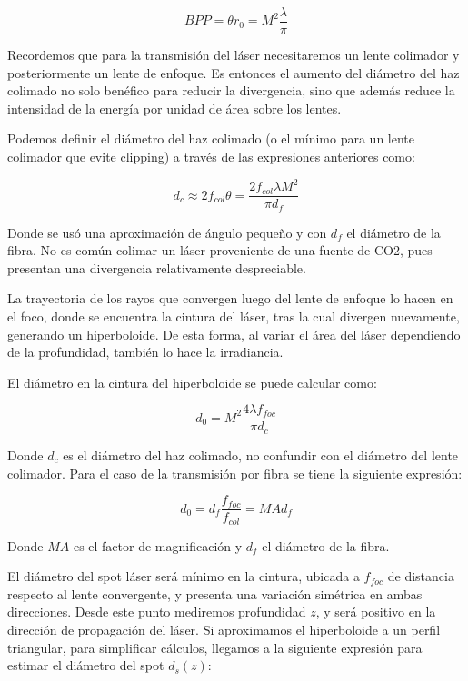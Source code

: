 \begin{equation}
	BPP=\theta r_{0}=M^{2}\frac{\lambda}{\pi}
\end{equation}

Recordemos que para la transmisión del láser necesitaremos un lente colimador y posteriormente un lente de enfoque. Es entonces el aumento del diámetro del haz colimado no solo benéfico para reducir la divergencia, sino que además reduce la intensidad de la energía por unidad de área sobre los lentes.

Podemos definir el diámetro del haz colimado (o el mínimo para un lente colimador que evite clipping) a través de las expresiones anteriores como:


\begin{equation}
	d_{c}\approx 2f_{col}\theta = \frac{2 f_{col}\lambda M^{2}}{\pi d_{f}}
\end{equation}

Donde se usó una aproximación de ángulo pequeño y con $d_{f}$ el diámetro de la fibra. No es común colimar un láser proveniente de una fuente de CO2, pues presentan una divergencia relativamente despreciable.

La trayectoria de los rayos que convergen luego del lente de enfoque lo hacen en el foco, donde se encuentra la cintura del láser, tras la cual divergen nuevamente, generando un hiperboloide. De esta forma, al variar el área del láser dependiendo de la profundidad, también lo hace la irradiancia.

El diámetro en la cintura del hiperboloide se puede calcular como:

\begin{equation}
	d_{0}=M^{2}\frac{4 \lambda f_{foc}}{\pi d_{c}}
\end{equation}

Donde $d_{c}$ es el diámetro del haz colimado, no confundir con el diámetro del lente colimador. Para el caso de la transmisión por fibra se tiene la siguiente expresión:

\begin{equation}
	d_{0}=d_{f}\frac{f_{foc}}{f_{col}}=MA d_{f}
\end{equation}

Donde $MA$ es el factor de magnificación y $d_{f}$ el diámetro de la fibra.

El diámetro del spot láser será mínimo en la cintura, ubicada a $f_{foc}$ de distancia respecto al lente convergente, y presenta una variación simétrica en ambas direcciones. Desde este punto mediremos profundidad $z$, y será positivo en la dirección de propagación del láser. Si aproximamos el hiperboloide a un perfil triangular, para simplificar cálculos, llegamos a la siguiente expresión para estimar el diámetro del spot $d_{s}(z)$:

